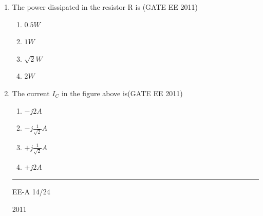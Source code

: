 \documentclass[a4paper,10pt]{exam}
\theoremstyle{remark}
\begin{document}
\begin{enumerate}
\begin{figure}[H]
\end{figure}
\item \quad The power dissipated in the resistor R is \hfill{(GATE EE 2011)}
\begin{multicols}{4}
\begin{enumerate}
\item $0.5 W$
\item $1 W$
\item $\sqrt{2} W$
\item $2 W$
\end{enumerate}
\end{multicols}


\item \quad The current $I_{C}$ in the figure above is\hfill{(GATE EE 2011)}
\begin{multicols}{4}
\begin{enumerate}
\item $-j2A$
\item $-j \frac{1}{\sqrt{2}}A$
\item $+j \frac{1}{\sqrt{2}}A$
\item $+j2A$
\end{enumerate}
\end{multicols}

\vfill
\noindent\rule{\textwidth}{0.4pt}
\raggedright{EE-A}
\hfill
14/24
\newpage
\raggedright{2011}
\hfill
{}\\


\end{enumerate}
\end{document}
